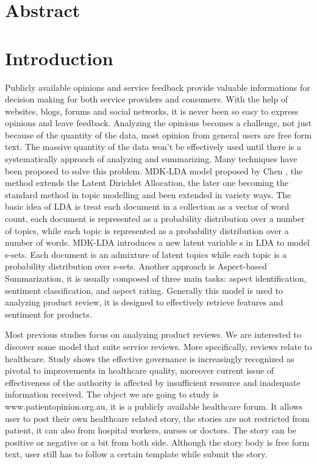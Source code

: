 \documentclass[11pt,twoside]{report}
\begin{document}
\chapter*{Abstract}

\chapter{Introduction}



Publicly available opinions and service feedback provide valuable informations for decision making for both service providers and consumers. With the help of websites, blogs, forums and social networks, it is never been so easy to express opinions and leave feedback. Analyzing the opinions becomes a challenge, not just because of the quantity of the data, most opinion from general users are free form text. The massive quantity of the data won’t be effectively used until there is a systematically approach of analyzing and summarizing. Many techniques have been proposed to solve this problem. MDK-LDA model proposed by Chen\cite{ref24} , the method extends the Latent Dirichlet Allocation\cite{ref25}, the later one becoming the standard method in topic modelling and been extended in variety ways. The basic idea of LDA is treat each document in a collection as a vector of word count, each document is represented as a probability distribution over a number of topics, while each topic is represented as a probability distribution over a number of words. MDK-LDA introduces a new latent variable s in LDA to model s-sets. Each document is an admixture of latent topics while each topic is a probability distribution over s-sets. Another approach is Aspect-based Summarization\cite{ref11}, it is usually composed of three main tasks: aspect identification, sentiment classification, and aspect rating. Generally this model is used to analyzing product review, it is designed to effectively retrieve features and sentiment for products.

Most previous studies focus on analyzing product reviews. We are interested to discover some model that suite service reviews. More specifically, reviews relate to healthcare. Study shows the effective governance is increasingly recognized as pivotal to improvements in healthcare quality\cite{ref6}, moreover current issue of effectiveness of the authority is affected by insufficient resource and inadequate information received\cite{ref5}.
The object we are going to study is www.patientopinion.org.au, it is a publicly available healthcare forum. It allows user to post their own healthcare related story, the stories are not restricted from patient, it can also from hospital workers, nurses or doctors. The story can be positive or negative or a bit from both side. Although the story body is free form text, user still has to follow a certain template while submit the story.
\end{document}
